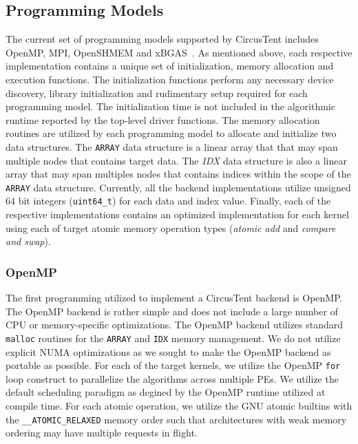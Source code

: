 \subsection{Programming Models}
\label{subsec:programming_models}

The current set of programming models supported by CircusTent includes 
OpenMP, MPI, OpenSHMEM and xBGAS~\cite{leidel2018xbgas}.  As mentioned above, 
each respective implementation contains a unique set of initialization,
memory allocation and execution functions.  The initialization functions perform 
any necessary device discovery, library initialization and rudimentary setup 
required for each programming model.  The initialization time is not 
included in the algorithmic runtime reported by the top-level driver functions.  
The memory allocation routines are utilized by each programming model 
to allocate and initialize two data structures.  The \texttt{ARRAY} data 
structure is a linear array that that may span multiple nodes that contains target 
data.  The \textit{IDX} data structure is also a linear array 
that may span multiples nodes that contains indices within the 
scope of the \texttt{ARRAY} 
data structure.  Currently, all the backend implementations utilize 
unsigned 64 bit integers (\texttt{uint64\_t}) for each data and index value.  
Finally, each of the respective implementations contains an 
optimized implementation for each kernel using each of target atomic memory 
operation types (\textit{atomic add} and \textit{compare and swap}).

\subsubsection{OpenMP}
\label{subsubsec:openmp}

The first programming utilized to implement a CircusTent backend is OpenMP.  
The OpenMP backend is rather simple and does not include a large number 
of CPU or memory-specific optimizations.  The OpenMP backend utilizes
standard \texttt{malloc} routines for the \texttt{ARRAY} and \texttt{IDX} 
memory management.  We do not utilize explicit NUMA optimizations as we 
sought to make the OpenMP backend as portable as possible.  For each of 
the target kernels, we utilize the OpenMP \texttt{for} loop construct 
to parallelize the algorithms across multiple PEs.  We utilize the 
default scheduling paradigm as degined by the OpenMP runtime utilized at 
compile time.  For each atomic operation, we utilize the GNU atomic builtins 
with the \texttt{\_\_ATOMIC\_RELAXED} memory order such that architectures 
with weak memory ordering may have multiple requests in flight.  


